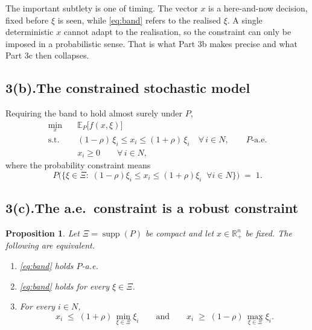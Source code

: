 \documentclass[11pt]{article}
\DeclareMathOperator*{\minimize}{min}
\DeclareMathOperator{\supp}{supp}
\newtheorem{proposition}{Proposition}
\theoremstyle{definition}
\begin{document}
The important subtlety is one of timing. The vector $x$ is a here-and-now
decision, fixed before $\xi$ is seen, while \eqref{eq:band} refers to the
realised $\xi$. A single deterministic $x$ cannot adapt to the
realisation, so the constraint can only be imposed in a probabilistic
sense. That is what Part 3b makes precise and what Part 3c then collapses.

\subsection*{3(b).\quad The constrained stochastic model}

Requiring the band to hold almost surely under $P$,
\begin{align}
  \minimize_{x} \quad & \mathbb{E}_{P}\big[ f(x,\xi) \big] \\
  \text{s.t.}\quad
    & (1-\rho)\,\xi_i \le x_i \le (1+\rho)\,\xi_i
      \quad \forall\, i \in N, \qquad P\text{-a.e.} \\
    & x_i \ge 0 \qquad \forall\, i \in N ,
\end{align}
where the probability constraint means
\[
  P\Big( \big\{ \xi \in \Xi :\;
    (1-\rho)\xi_i \le x_i \le (1+\rho)\xi_i \;\;\forall i \in N \big\} \Big)
  \;=\; 1 .
\]

\subsection*{3(c).\quad The a.e.\ constraint is a robust constraint}

\begin{proposition}
\label{prop:aerobust}
Let $\Xi = \supp(P)$ be compact and let $x \in \mathbb{R}^n_+$ be fixed.
The following are equivalent.
\begin{enumerate}
  \item[(i)] \eqref{eq:band} holds $P$-a.e.
  \item[(ii)] \eqref{eq:band} holds for every $\xi \in \Xi$.
  \item[(iii)] For every $i \in N$,
    \[
      x_i \;\le\; (1+\rho)\,\min_{\xi \in \Xi} \xi_i
      \qquad\text{and}\qquad
      x_i \;\ge\; (1-\rho)\,\max_{\xi \in \Xi} \xi_i .
    \]
\end{enumerate}
\end{proposition}
\end{document}
